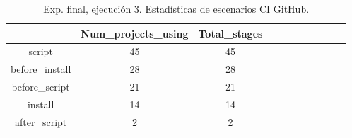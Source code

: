 \begin{table}[h]
  \centering
  \caption{Exp. final, ejecución 3. Estadísticas de escenarios CI GitHub.}
  \label{tab:tabla_f_3_4}

\begin{footnotesize}
\renewcommand{\arraystretch}{1.5} %
\begin{tabular}{ccccccccccc}
  \hline
  {} &  Num\_projects\_using &  Total\_stages \\
  \hline
  script         &                  45 &            45 \\
  before\_install &                  28 &            28 \\
  before\_script  &                  21 &            21 \\
  install        &                  14 &            14 \\
  after\_script   &                   2 &             2 \\
 \end{tabular}
\end{footnotesize}

\end{table}